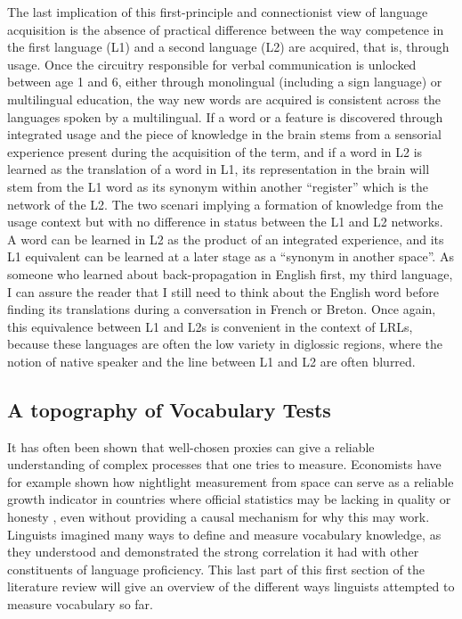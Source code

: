 The last implication of this first-principle and connectionist view of language acquisition is the absence of practical difference between the way competence in the first language (L1) and a second language (L2) are acquired, that is, through usage. Once the circuitry responsible for verbal communication is unlocked between age 1 and 6, either through monolingual (including a sign language) or multilingual education, the way new words are acquired is consistent across the languages spoken by a multilingual. If a word or a feature is discovered through integrated usage and the piece of knowledge in the brain stems from a sensorial experience present during the acquisition of the term, and if a word in L2 is learned as the translation of a word in L1, its representation in the brain will stem from the L1 word as its synonym within another ``register'' which is the network of the L2. The two scenari implying a formation of knowledge from the usage context but with no difference in status between the L1 and L2 networks. A word can be learned in L2 as the product of an integrated experience, and its L1 equivalent can be learned at a later stage as a ``synonym in another space''. As someone who learned about back-propagation in English first, my third language, I can assure the reader that I still need to think about the English word before finding its translations during a conversation in French or Breton. Once again, this equivalence between L1 and L2s is convenient in the context of LRLs, because these languages are often the low variety in diglossic regions, where the notion of native speaker and the line between L1 and L2 are often blurred.

    \subsection{A topography of Vocabulary Tests}
It has often been shown that well-chosen proxies can give a reliable understanding of complex processes that one tries to measure. Economists have for example shown how nightlight measurement from space can serve as a reliable growth indicator in countries where official statistics may be lacking in quality or honesty \parencite{henderson_measuring_2009}, even without providing a causal mechanism for why this may work. Linguists imagined many ways to define and measure vocabulary knowledge, as they understood and demonstrated the strong correlation it had with other constituents of language proficiency. This last part of this first section of the literature review will give an overview of the different ways linguists attempted to measure vocabulary so far.

